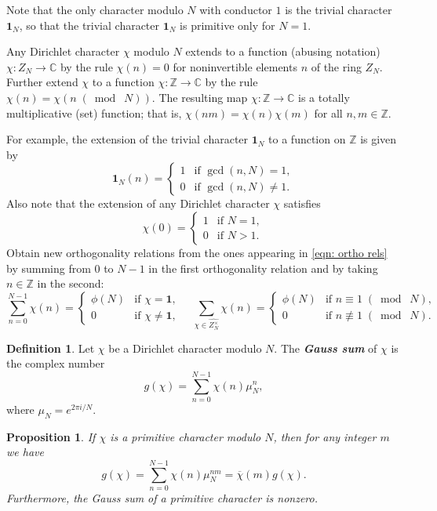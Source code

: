\documentclass[10pt,leqno,twoside,b5paper]{article}
\theoremstyle{plain}
\newtheorem{proposition}[lem]{Proposition}
\theoremstyle{definition}
\newtheorem{definition/}[lem]{Definition}
\newenvironment{definition}
  {\renewcommand{\qedsymbol}{\textdagger}%
   \pushQED{\qed}\begin{definition/}}
  {\popQED\end{definition/}}
\numberwithin{equation}{section}
\numberwithin{lem}{section}
\newcommand{\textib}[1]{\textbf{\textit{#1\index{#1}}}} %
\newcommand{\smod}[1]{\;(\bmod\; #1)}
\begin{document}
Note that the only character modulo $N$ with conductor $1$ is the trivial character $\mathbf 1_N$, so that the trivial character $\mathbf 1_N$ is primitive only for $N = 1$.

Any Dirichlet character $\chi$ modulo $N$ extends to a function (abusing notation) $\chi\colon Z_N\to\mathbb C$ by the rule $\chi(n) = 0$ for noninvertible elements $n$ of the ring $Z_N$. Further extend $\chi$ to a function $\chi\colon\mathbb Z\to\mathbb C$ by the rule $\chi(n) = \chi(n\smod N)$. The resulting map $\chi\colon \mathbb Z\to \mathbb C$ is a totally multiplicative (set) function; that is, $\chi(nm) = \chi(n)\chi(m)$ for all $n,m\in \mathbb Z$.

For example, the extension of the trivial character $\mathbf 1_N$ to a function on $\mathbb Z$ is given by
\[\mathbf 1_N(n) = \begin{cases}
    1 & \text{if $\gcd(n,N)=1$},\\
    0 & \text{if $\gcd(n,N)\neq1$}.
\end{cases}\]
Also note that the extension of any Dirichlet character $\chi$ satisfies 
\[\chi(0) = \begin{cases}
    1 & \text{if $N = 1$},\\
    0 & \text{if $N > 1$}.
\end{cases}\]
Obtain new orthogonality relations from the ones appearing in \cref{eqn: ortho rels} by summing from $0$ to $N-1$ in the first orthogonality relation and by taking $n\in\mathbb Z$ in the second:
\begin{equation}\label{eqn: new ortho rels}
    \sum_{n=0}^{N-1}\chi(n) = \begin{cases}
        \phi(N) & \text{if $\chi = \mathbf 1$},\\
        0 & \text{if $\chi\neq \mathbf 1$},
    \end{cases}\quad\sum_{\chi\in \widehat{Z_N^\times}}\chi(n) = \begin{cases}
        \phi(N) & \text{if $n\equiv 1\smod N$},\\
        0 & \text{if $n\not\equiv 1\smod N$}.
    \end{cases} 
\end{equation}
\begin{definition}
    Let $\chi$ be a Dirichlet character modulo $N$. The \textib{Gauss sum} of $\chi$ is the complex number
    \[g(\chi) = \sum_{n=0}^{N-1}\chi(n)\mu_N^n,\] where $\mu_N = e^{2\pi i/N}$.
\end{definition}
\begin{proposition}
    If $\chi$ is a primitive character modulo $N$, then for any integer $m$ we have 
    \[g(\chi) = \sum_{n=0}^{N-1}\chi(n)\mu_N^{nm} = \overline\chi(m)g(\chi).\] Furthermore, the Gauss sum of a primitive character is nonzero.
\end{proposition}
\end{document}
